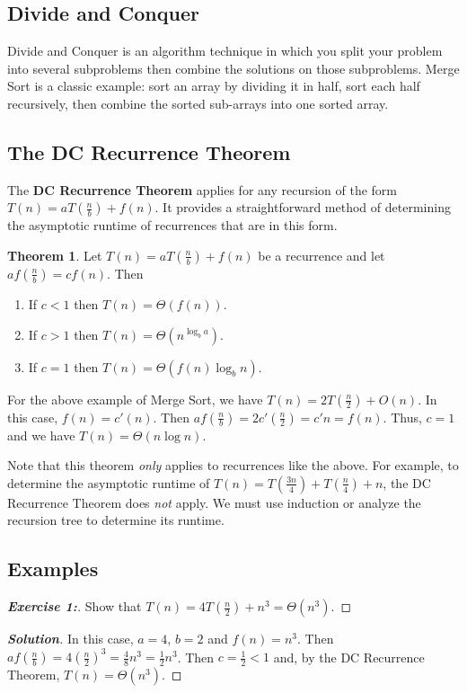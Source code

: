 \documentclass[a4paper]{article}
\newenvironment{solution}{\begin{proof}[\textnormal{\textbf{Solution}}]}{\end{proof}}
\newenvironment{exercise}[1]{\begin{proof}[\textnormal{\textbf{Exercise #1:}}]\phantom{\qedhere}}{\end{proof}}
\theoremstyle{definition}
\newtheorem*{thm}{Theorem}
\begin{document}
\subsection{Divide and Conquer}
Divide and Conquer is an algorithm technique in which you split your problem into several subproblems then combine the solutions on those subproblems. Merge Sort is a classic example: sort an array by dividing it in half, sort each half recursively, then combine the sorted sub-arrays into one sorted array. 

\subsection{The DC Recurrence Theorem}
The \textbf{DC Recurrence Theorem} applies for any recursion of the form $T(n)=aT(\frac{n}{b})+f(n)$. It provides a straightforward method of determining the asymptotic runtime of recurrences that are in this form. 
\begin{thm}
 Let $T(n)=aT(\frac{n}{b})+f(n)$ be a recurrence and let $af(\frac{n}{b})=cf(n)$. Then 
 \begin{enumerate}
  \item If $c<1$ then $T(n)=\Theta(f(n))$.
  \item If $c>1$ then $T(n)=\Theta(n^{\log_ba})$.
  \item If $c=1$ then $T(n)=\Theta(f(n)\log_bn)$.
 \end{enumerate}
\end{thm}

For the above example of Merge Sort, we have $T(n)=2T(\frac{n}{2})+O(n)$. In this case, $f(n)=c'(n)$. Then $af(\frac{n}{b})=2c'(\frac{n}{2})=c'n=f(n)$. Thus, $c=1$ and we have $T(n)=\Theta(n\log{n})$. 

Note that this theorem \textit{only} applies to recurrences like the above. For example, to determine the asymptotic runtime of $T(n)=T(\frac{3n}{4})+T(\frac{n}{4})+n$, the DC Recurrence Theorem does \textit{not} apply. We must use induction or analyze the recursion tree to determine its runtime.

\subsection{Examples}
\begin{exercise}{1}
 Show that $T(n)=4T(\frac{n}{2})+n^3=\Theta(n^3)$.
\end{exercise}

\begin{solution}
 In this case, $a=4$, $b=2$ and $f(n)=n^3$. Then $af(\frac{n}{b})=4\left(\frac{n}{2}\right)^3=\frac{4}{8}n^3=\frac{1}{2}n^3$. Then $c=\frac{1}{2}<1$ and, by the DC Recurrence Theorem, $T(n)=\Theta(n^3)$.
\end{solution}
\end{document}
